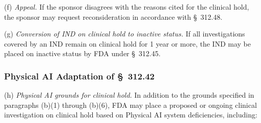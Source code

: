 (f) \textit{Appeal.} If the sponsor disagrees with the reasons cited for the clinical hold, the sponsor may request reconsideration in accordance with \S~312.48.

(g) \textit{Conversion of IND on clinical hold to inactive status.} If all investigations covered by an IND remain on clinical hold for 1 year or more, the IND may be placed on inactive status by FDA under \S~312.45.

\subsubsection{Physical AI Adaptation of \S~312.42}

(h) \textit{Physical AI grounds for clinical hold.} In addition to the grounds specified in paragraphs (b)(1) through (b)(6), FDA may place a proposed or ongoing clinical investigation on clinical hold based on Physical AI system deficiencies, including:

